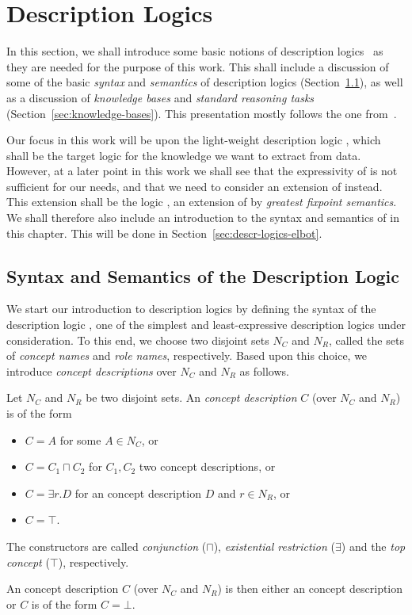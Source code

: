 \chapter{Description Logics}
\label{cha:description-logics}

In this section, we shall introduce some basic notions of description
logics~\cite{DLhandbook} as they are needed for the purpose of this work.  This shall
include a discussion of some of the basic \emph{syntax} and \emph{semantics} of
description logics (Section~\ref{sec:basic-noti-descr}), as well as a discussion of
\emph{knowledge bases} and \emph{standard reasoning tasks}
(Section~\ref{sec:knowledge-bases}).  This presentation mostly follows the one
from~\cite{Diss-Felix}.

Our focus in this work will be upon the light-weight description logic \ELbot, which shall
be the target logic for the knowledge we want to extract from data.  However, at a later
point in this work we shall see that the expressivity of \ELbot is not sufficient for our
needs, and that we need to consider an extension of \ELbot instead.  This extension shall
be the logic \ELgfpbot, an extension of \ELbot by \emph{greatest fixpoint semantics}.  We
shall therefore also include an introduction to the syntax and semantics of \ELgfpbot in
this chapter.  This will be done in Section~\ref{sec:descr-logics-elbot}.

\section{Syntax and Semantics of the Description Logic \ELbot}
\label{sec:basic-noti-descr}

We start our introduction to description logics by defining the syntax of the description
logic \ELbot, one of the simplest and least-expressive description logics under
consideration.  To this end, we choose two disjoint sets $N_C$ and $N_R$, called the sets
of \emph{concept names} and \emph{role names}, respectively.  Based upon this choice, we
introduce \emph{\ELbot concept descriptions} over $N_C$ and $N_R$ as follows.
\begin{Definition}
  \label{def:ELbot-concept-descriptions}
  Let $N_C$ and $N_R$ be two disjoint sets.  An \emph{\EL concept description} $C$ (over
  $N_C$ and $N_R$) is of the form
  \begin{itemize}
  \item $C = A$ for some $A \in N_C$, or
  \item $C = C_1 \sqcap C_2$ for $C_1, C_2$ two \EL concept descriptions, or
  \item $C = \exists r. D$ for an \EL concept description $D$ and $r \in N_R$, or
  \item $C = \top$.
  \end{itemize}
  The constructors are called \emph{conjunction} ($\sqcap$), \emph{existential
    restriction} ($\exists$) and the \emph{top concept} ($\top$), respectively.

  An \ELbot concept description $C$ (over $N_C$ and $N_R$) is then either an \EL concept
  description or $C$ is of the form $C = \bot$.
\end{Definition}

